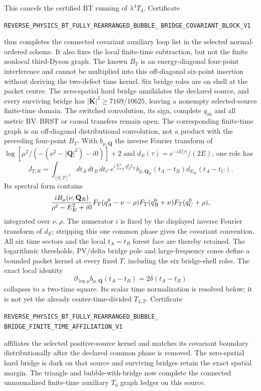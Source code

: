 \documentclass[11pt]{article}
\theoremstyle{definition}
\theoremstyle{remark}
\begin{document}
This cancels the certified BT running of $\lambda^4T_4$.  Certificate
\par\noindent
\texttt{REVERSE\_PHYSICS\_BT\_FULLY\_REARRANGED\_BUBBLE\_}
\allowbreak\texttt{BRIDGE\_COVARIANT\_BLOCK\_V1}
\par\noindent
thus completes the connected covariant auxiliary loop list in the selected
normal-ordered scheme.  It also fixes the local finite-time subtraction, but
not the finite nonlocal third-Dyson graph.  The known $B_T$ is an
energy-diagonal four-point interference and cannot be multiplied into this
off-diagonal six-point insertion without deriving the two-defect time kernel.
Six bridge roles are on shell at the packet centre.  The zero-spatial hard
bridge annihilates the declared source, and every surviving bridge has
$|\mathbf K|^2\ge7169/10625$, leaving a nonempty selected-source finite-time
domain.  The switched convolution, its sign, complete $q_{10}$ and all metric
BV--BRST or causal transfers remain open.
The corresponding finite-time graph is an off-diagonal distributional
convolution, not a product with the preceding four-point \(B_T\).  With
\(b_{\mu,\mathbf Q}\) the inverse Fourier transform of
\(\log[\mu^2/(-(\nu^2-|\mathbf Q|^2)-i0)]+2\) and
\(d_E(\tau)=e^{-iE|\tau|}/(2E)\), one role has
\[
 J_{T,R}=\int_{[0,T]^3}dt_A\,dt_B\,dt_C\,
 e^{i\sum_Xq_X^0t_X}
 b_{\mu,\mathbf Q_R}(t_A-t_B)d_{E_K}(t_A-t_C).
\]
Its spectral form contains
\[
 {iB_\mu(\nu,\mathbf Q_R)\over\rho^2-E_K^2+i0}
 F_T(q_A^0-\nu-\rho)F_T(q_B^0+\nu)F_T(q_C^0+\rho),
\]
integrated over \(\nu,\rho\).  The numerator \(i\) is fixed by the displayed
inverse Fourier transform of \(d_E\); stripping this one common phase gives
the covariant convention.  All six time sectors and the local
\(t_A=t_B\) forest face are thereby retained.  The logarithmic thresholds,
PV/delta bridge pole and large-frequency cones define a bounded packet kernel
at every fixed \(T\), including the six bridge-shell roles.  The exact local
identity
\[
 \partial_{\log\mu}b_{\mu,\mathbf Q}(t_A-t_B)
 =2\delta(t_A-t_B)
\]
collapses to a two-time square.  Its scalar time normalization is resolved
below; it is not yet the already center-time-divided \(T_{4,T}\).  Certificate
\par\noindent
\texttt{REVERSE\_PHYSICS\_BT\_FULLY\_REARRANGED\_BUBBLE\_}
\allowbreak\texttt{BRIDGE\_FINITE\_TIME\_AFFILIATION\_V1}
\par\noindent
affiliates the selected positive-source kernel and matches its covariant
boundary distributionally after the declared common phase is removed.  The
zero-spatial hard bridge is dark on that
source and surviving bridges retain the exact spatial margin.  The triangle
and bubble-with-bridge now complete the connected unnormalized finite-time
auxiliary \(T_6\) graph ledger on this source.
\end{document}
